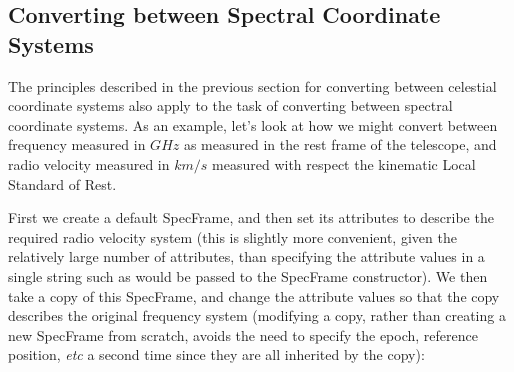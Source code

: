 \documentclass[twoside,11pt]{article}
\begin{document}
\subsection{\label{ss:convertingspecframes}Converting between Spectral Coordinate Systems}
The principles described in the previous section for converting between
celestial coordinate systems also apply to the task of converting between
spectral coordinate systems. As an example, let's look at how we might
convert between frequency measured in $GHz$ as measured in the rest frame
of the telescope, and radio velocity measured in $km/s$ measured with
respect the kinematic Local Standard of Rest.

First we create a default SpecFrame, and then set its attributes to
describe the required radio velocity system (this is slightly more
convenient, given the relatively large number of attributes, than
specifying the attribute values in a single string such as would be
passed to the SpecFrame constructor). We then take a copy of this
SpecFrame, and change the attribute values so that the copy describes the
original frequency system (modifying a copy, rather than creating a new
SpecFrame from scratch, avoids the need to specify the epoch, reference
position, \emph{etc} a second time since they are all inherited by the copy):
\end{document}
